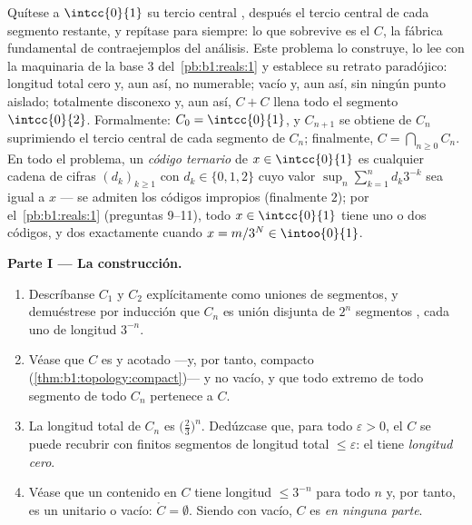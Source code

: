 \begin{problem}[{Problema del fin de semana --- el \omterm{pb:b1:topology:1}{conjunto de Cantor}
de los tercios centrales: longitud cero, no numerable, perfecto y
$C + C = \intcc{0}{2}$}]
\label{pb:b1:topology:1}
Quítese a $\intcc{0}{1}$ su tercio central , después el tercio
central de cada segmento restante, y repítase para siempre: lo que
sobrevive es el \emph{} $C$, la fábrica fundamental
de contraejemplos del análisis. Este problema lo construye, lo lee con
la maquinaria de la base $3$ del~\cref{pb:b1:reals:1} y establece su
retrato paradójico: longitud total cero y, aun así, no numerable;
 vacío y, aun así, sin ningún punto aislado; totalmente
disconexo y, aun así, $C + C$ llena todo el segmento
$\intcc{0}{2}$. Formalmente:
$C_0 = \intcc{0}{1}$, y $C_{n+1}$ se obtiene de $C_n$ suprimiendo el
tercio central  de cada segmento de $C_n$; finalmente,
$C = \bigcap_{n \geq 0} C_n$. En todo el problema, un \emph{código
ternario} de $x \in \intcc{0}{1}$ es cualquier cadena de cifras
$(d_k)_{k\geq1}$ con $d_k \in \{0, 1, 2\}$ cuyo valor
$\sup_n \sum_{k=1}^n d_k 3^{-k}$ sea igual a $x$ --- se admiten los
códigos impropios (finalmente $2$); por el~\cref{pb:b1:reals:1}
(preguntas 9--11), todo $x \in \intcc{0}{1}$ tiene uno o dos códigos,
y dos exactamente cuando $x = m/3^N \in \intoo{0}{1}$.

\medskip
\noindent\textbf{Parte I --- La construcción.}
\begin{enumerate}
  \item Descríbanse $C_1$ y $C_2$ explícitamente como uniones de
        segmentos, y demuéstrese por inducción que $C_n$ es unión
        disjunta de $2^n$ segmentos , cada uno de longitud
        $3^{-n}$.
  \item Véase que $C$ es  y acotado ---y, por tanto, compacto
        (\cref{thm:b1:topology:compact})--- y no vacío, y que todo
        extremo de todo segmento de todo $C_n$ pertenece a $C$.
  \item La longitud total de $C_n$ es $\bigl(\frac23\bigr)^n$.
        Dedúzcase que, para todo $\varepsilon > 0$, el  $C$ se
        puede recubrir con finitos segmentos de longitud total
        $\leq \varepsilon$: el  tiene
        \emph{longitud cero}.
  \item Véase que un  contenido en $C$ tiene longitud
        $\leq 3^{-n}$ para todo $n$ y, por tanto, es un 
        unitario o vacío: $\mathring C = \emptyset$. Siendo 
        con  vacío, $C$ es \emph{ en ninguna parte}.
\end{enumerate}


\end{problem}
